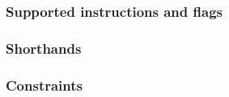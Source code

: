 
\subsubsection{Supported instructions and flags }   \label{hub: instruction handling: transient storage: flags}          %
\subsubsection{Shorthands                       }   \label{hub: instruction handling: transient storage: shorthands}     %
\subsubsection{Constraints                      }   \label{hub: instruction handling: transient storage: constraints}    %
